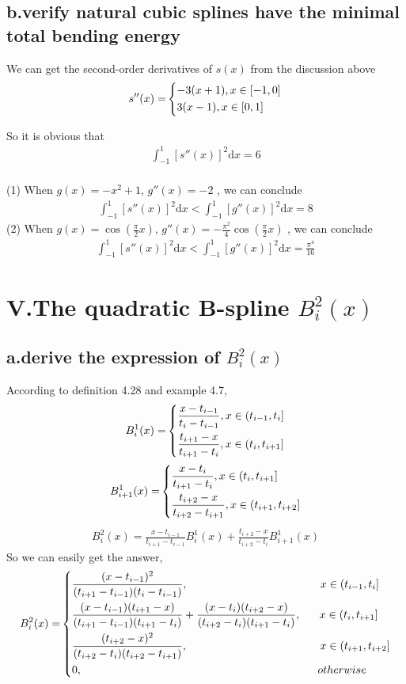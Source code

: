 \documentclass[twoside,a4paper]{article}
\newcommand{\dif}{\mathrm{d}}
\begin{document}
\subsection*{b.verify natural cubic splines have the minimal total bending energy}
We can get the second-order derivatives of $s(x)$ from the discussion above
\[\text{$s''(x)=$}
\left\{
\begin{lgathered}
-3(x+1) , x \in [-1,0]\\
3(x-1) , x \in [0,1]
\end{lgathered} 
\right.
\]

So it is obvious that
\begin{gather}
\int_{-1}^1[s''(x)]^2 \dif x=6
\end{gather}
\\
(1) When $g(x)=-x^2+1$, $g''(x)=-2$ , we can conclude
\begin{gather}
\int_{-1}^1[s''(x)]^2 \dif x < \int_{-1}^1[g''(x)]^2 \dif x=8 
\end{gather}
(2) When $g(x)=\cos{(\frac{\pi}{2}x)}$, $g''(x)=-\frac{\pi^2}{4}\cos{(\frac{\pi}{2}x)}$ , we can conclude
\begin{gather}
\int_{-1}^1[s''(x)]^2 \dif x < \int_{-1}^1[g''(x)]^2 \dif x= \frac{\pi^4}{16} 
\end{gather}
\section*{V.The quadratic B-spline $B_i^2(x)$}
\subsection*{a.derive the expression of $B_i^2(x)$}
According to definition 4.28 and example 4.7,
\[\text{$B_i^1(x)=$}
\left\{
\begin{lgathered}
\frac{x-t_{i-1}}{t_i-t_{i-1}}, x \in (t_{i-1},t_i]\\
\frac{t_{i+1}-x}{t_{i+1}-t_i}, x\in (t_i,t_{i+1}]
\end{lgathered} 
\right.
\]
\[\text{$B_{i+1}^1(x)=$}
\left\{
\begin{lgathered}
\frac{x-t_{i}}{t_{i+1}-t_i}, x \in (t_i,t_{i+1}]\\
\frac{t_{i+2}-x}{t_{i+2}-t_{i+1}}, x\in (t_{i+1},t_{i+2}]
\end{lgathered} 
\right.
\]
\begin{gather}
B_i^{2}(x)=\frac{x-t_{i-1}}{t_{i+1}-t_{i-1}}B^1_i(x)+\frac{t_{i+2}-x}{t_{i+2}-t_i}B_{i+1}^1(x)
\end{gather}
So we can easily get the answer,
\[\text{$B_{i}^2(x)=$}
\left\{
\begin{lgathered}
\frac{(x-t_{i-1})^2}{(t_{i+1}-t_{i-1})(t_i-t_{i-1})},\qquad\qquad\qquad\qquad\qquad\qquad x \in (t_{i-1},t_{i}]\\
\frac{(x-t_{i-1})(t_{i+1}-x)}{(t_{i+1}-t_{i-1})(t_{i+1}-t_i)}+\frac{(x-t_i)(t_{i+2}-x)}{(t_{i+2}-t_i)(t_{i+1}-t_i)}, \ \ \quad x\in (t_{i},t_{i+1}]\\
\frac{(t_{i+2}-x)^2}{(t_{i+2}-t_i)(t_{i+2}-t_{i+1})}, \qquad \qquad\qquad \qquad\qquad\qquad x \in (t_{i+1},t_{i+2}]\\
0, \qquad \qquad\qquad\qquad\qquad\qquad\qquad\qquad\qquad\qquad\quad \  otherwise
\end{lgathered} 
\right.
\]
\end{document}
